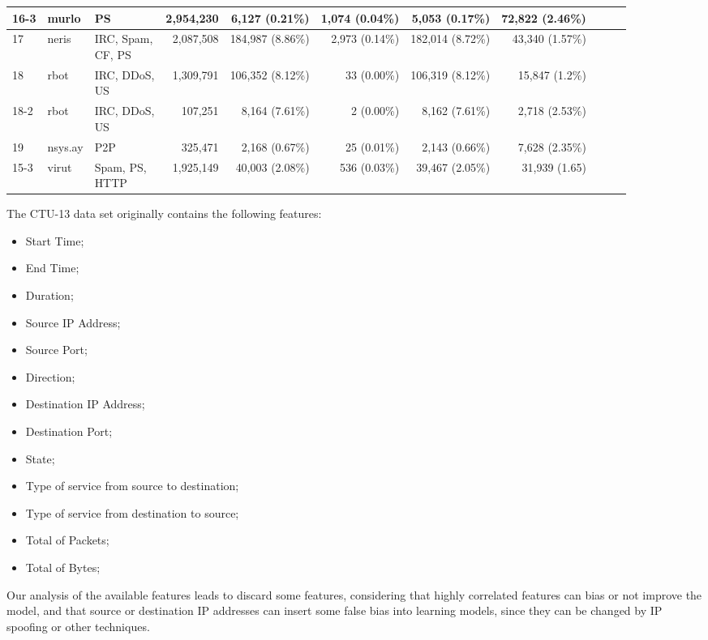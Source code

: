 \begin{table}[h!]
\begin{tabular}{| l | l | l | r | r | r | r | r | r | r | r | }
			16-3 & murlo &PS & 2,954,230 & 6,127 (0.21\%) & 1,074 (0.04\%) & 5,053 (0.17\%) &72,822 (2.46\%)\\ \hline
			17 & neris &\makecell[l]{IRC, Spam,\\CF, PS} & 2,087,508 & 184,987 (8.86\%) & 2,973 (0.14\%) & 182,014 (8.72\%) &43,340 (1.57\%)\\ \hline
			18 & rbot &\makecell[l]{IRC, DDoS,\\US} & 1,309,791 & 106,352 (8.12\%) & 33 (0.00\%) & 106,319 (8.12\%) &15,847 (1.2\%)\\ \hline
			18-2 & rbot &\makecell[l]{IRC, DDoS,\\US} & 107,251 & 8,164 (7.61\%) & 2 (0.00\%) & 8,162 (7.61\%) &2,718 (2.53\%)\\ \hline
			19 & nsys.ay &P2P & 325,471 & 2,168 (0.67\%) & 25 (0.01\%) & 2,143 (0.66\%) &7,628 (2.35\%)\\ \hline
			15-3 & virut &\makecell[l]{Spam, PS,\\HTTP} & 1,925,149 & 40,003 (2.08\%) & 536 (0.03\%) & 39,467 (2.05\%) &31,939 (1.65)\\ \hline
	\end{tabular}
\end{table}

The CTU-13 data set originally contains the following features:  

\begin{itemize}
	\item Start Time;
	\item End Time;
	\item Duration;
	\item Source IP Address;
	\item Source Port;
	\item Direction;
	\item Destination IP Address;
	\item Destination Port;
	\item State;
	\item Type of service from source to destination;
	\item Type of service from destination to source;
	\item Total of Packets;
	\item Total of Bytes;
\end{itemize}

Our analysis of the available features leads to discard some features, considering that highly correlated features can bias or not improve the model, and that source or destination IP addresses can insert some false bias into learning models, since they can be changed by IP spoofing or other techniques.

